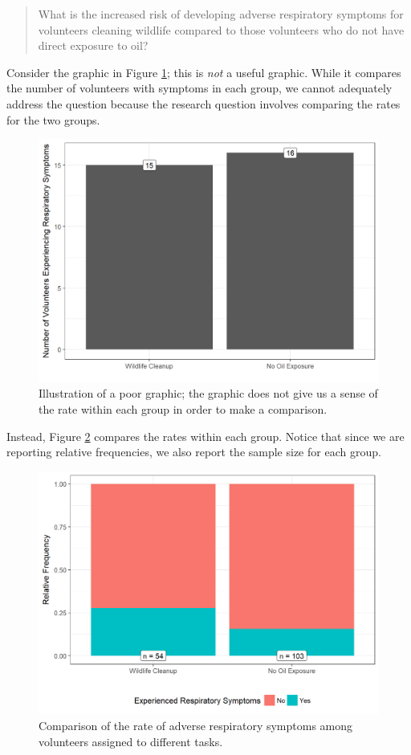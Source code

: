 \documentclass[]{book}
\theoremstyle{plain}
\theoremstyle{mydefn}
\theoremstyle{myexmpl}
\theoremstyle{remark}
\begin{document}
\begin{quote}
What is the increased risk of developing adverse respiratory symptoms
for volunteers cleaning wildlife compared to those volunteers who do not
have direct exposure to oil?
\end{quote}

Consider the graphic in Figure \ref{fig:summaries-bad-barchart}; this is
\emph{not} a useful graphic. While it compares the number of volunteers
with symptoms in each group, we cannot adequately address the question
because the research question involves comparing the rates for the two
groups.

\begin{figure}

{\centering \includegraphics[width=0.8\linewidth]{./Images/summaries-bad-barchart-1} 

}

\caption{Illustration of a poor graphic; the graphic does not give us a sense of the rate within each group in order to make a comparison.}\label{fig:summaries-bad-barchart}
\end{figure}

Instead, Figure \ref{fig:summaries-good-barchart} compares the rates
within each group. Notice that since we are reporting relative
frequencies, we also report the sample size for each group.

\begin{figure}

{\centering \includegraphics[width=0.8\linewidth]{./Images/summaries-good-barchart-1} 

}

\caption{Comparison of the rate of adverse respiratory symptoms among volunteers assigned to different tasks.}\label{fig:summaries-good-barchart}
\end{figure}
\end{document}
